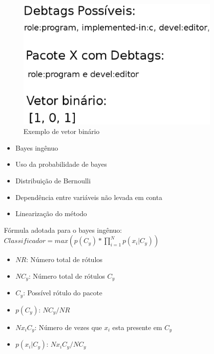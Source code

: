\begin{frame}
 \begin{figure}[h]
  \centering
  \includegraphics[width=0.9\textwidth]{figura/vetor_binario.eps}
  \caption{Exemplo de vetor binário}
  \label{fig:curva_aprendizado}
 \end{figure}
\end{frame}

\begin{frame}

    \begin{itemize}
        \item Bayes ingênuo
        \item Uso da probabilidade de bayes
        \item Distribuição de Bernoulli
        \item Dependência entre variáveis não levada em conta
        \item Linearização do método
    \end{itemize}

\end{frame}

\begin{frame}

    Fórmula adotada para o bayes ingênuo:
    \newline
    \newline
    $Classificador = max(p(C_{y})*\prod_{i=1}^{N}p(x_{i}|C_{y}))$


    \begin{itemize}
        \item $NR$: Número total de rótulos
        \item $NC_{y}$: Número total de rótulos $C_{y}$
        \item $C_{y}$: Possível rótulo do pacote
        \item $p(C_{y})$: $NC_{y}/NR$
        \item $Nx_{i}C_{y}$: Número de vezes que $x_{i}$ esta presente em $C_{y}$
        \item $p(x_{i}|C_{y})$: $Nx_{i}C_{y}/NC_{y}$
    \end{itemize}


\end{frame}

